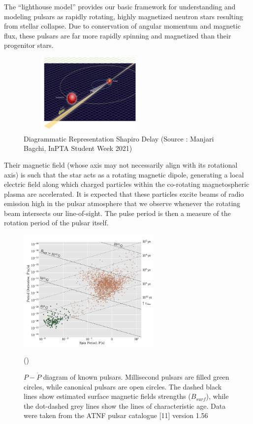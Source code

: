 \documentclass{article}
\begin{document}
The “lighthouse model” provides our basic framework for understanding and modeling pulsars as rapidly rotating, highly magnetized neutron stars resulting from stellar collapse. Due to conservation of angular momentum and magnetic flux, these pulsars are far more rapidly spinning and magnetized than their progenitor stars.
\begin{figure}[h!]
\begin{center}
\includegraphics[height=4cm,width=7cm]{Images/Pulsar1.png}
\caption{Diagrammatic Representation Shapiro Delay (Source : Manjari Bagchi, InPTA Student Week 2021)}
\end{center}
\end{figure}
Their magnetic field (whose axis may not necessarily align with its rotational axis) is such that the star acts as a rotating magnetic dipole, generating a local electric field along which charged particles within the
co-rotating magnetospheric plasma are accelerated. It is expected that these particles excite beams of radio emission high in the pulsar atmosphere that we observe whenever the rotating beam intersects our line-of-sight. The pulse period is then a measure of the rotation period of the pulsar itself.

\begin{figure}[h!]
\begin{center}
\includegraphics[height=6cm,width=7cm]{Images/V2_3.png}
\end{center}
\caption{
$P - \dot{P}$ diagram of known pulsars. Millisecond pulsars are filled green circles, while canonical pulsars are open circles. The dashed black lines show estimated surface magnetic fields strengths ($B_{surf}$), while the dot-dashed grey lines show the lines of characteristic age. Data were taken from the ATNF pulsar catalogue [11] version 1.56} (\cite{taylor2021nanohertz})
\end{figure}
\end{document}
